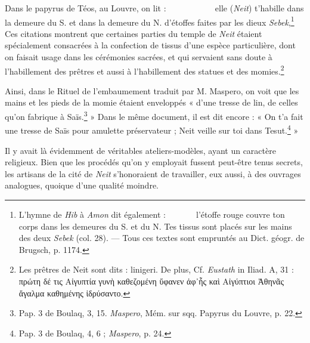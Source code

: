 \documentclass[a4paper, 11pt, oneside]{article}
\newcommand*\hieroglyhicsAAAC{}
\newcommand*\hieroglyhicsAAAG{}
\newcommand*\hieroglyhicsAAAQ{}
\newcommand*\hieroglyhicsAAAW{\raisebox{0.5ex}{}}
\newcommand*\hieroglyhicsAAAX{}
\newcommand*\hieroglyhicsAABR{}
\newcommand*\hieroglyhicsAACM{}
\newcommand*\hieroglyhicsAACN{\raisebox{1ex}{}}
\newcommand*\hieroglyhicsAACS{}
\newcommand*\hieroglyhicsAAEF{}
\newcommand*\hieroglyhicsAAEK{}
\newcommand*\hieroglyhicsAAEZ{}
\newcommand*\hieroglyhicsAAFD{}
\newcommand*\hieroglyhicsAAFZ{\raisebox{0.5ex}{}}
\newcommand*\hieroglyhicsAAGC{}
\newcommand*\hieroglyhicsAAGD{}
\newcommand*\hieroglyhicsAAGE{}
\newcommand*\hieroglyhicsAAGF{}
\newcommand*\hieroglyhicsAAGG{}
\newcommand*\hieroglyhicsAAGH{}
\newcommand*\hieroglyhicsAAGI{}
\newcommand*\hieroglyhicsAAGJ{}
\newcommand*\hieroglyhicsAAGK{}
\newcommand*\hieroglyhicsAAGL{}
\newcommand*\hieroglyhicsAAGM{}
\newcommand*\hieroglyhicsAAGN{}
\newcommand*\hieroglyhicsAAGO{}
\newcommand*\hieroglyhicsAAGP{\raisebox{0.3ex}{}}
\newcommand*\hieroglyhicsAAGQ{}
\newcommand*\hieroglyhicsAAGR{}
\newcommand*\hieroglyhicsAAGS{}
\newcommand*\hieroglyhicsAAGT{}
\begin{document}
Dans le papyrus de Téos, au Louvre, on lit : $\hieroglyhicsAACS\:\hieroglyhicsAAGC\:\hieroglyhicsAAAG\allowbreak\:\hieroglyhicsAABR\:\hieroglyhicsAAFZ\:\hieroglyhicsAACS\allowbreak\:\hieroglyhicsAAGD\:\hieroglyhicsAABR\:\hieroglyhicsAAAX\allowbreak\:\hieroglyhicsAAAQ\:\hieroglyhicsAAAC\:\hieroglyhicsAAGE\allowbreak\:\hieroglyhicsAAAW\:\hieroglyhicsAAGF\:\hieroglyhicsAAGG\allowbreak\:\hieroglyhicsAABR\:\hieroglyhicsAAGH\:\hieroglyhicsAACN\:\hieroglyhicsAACS\allowbreak\:\hieroglyhicsAAFD\:\hieroglyhicsAAGI\:\hieroglyhicsAAEK\allowbreak\:\hieroglyhicsAAEK\:\hieroglyhicsAAEF$ elle (\emph{Neit}) t'habille dans la demeure du S. et dans la demeure du N. d'étoffes faites par les dieux \emph{Sebek},\footnote{L'hymne de \emph{Hib} à \emph{Amon} dit également : $\hieroglyhicsAAGJ\:\hieroglyhicsAAGK\:\hieroglyhicsAACM\allowbreak\:\hieroglyhicsAAEZ\:\hieroglyhicsAAGL\:\hieroglyhicsAAGM\allowbreak\:\hieroglyhicsAAAX\:\hieroglyhicsAAGN\:\hieroglyhicsAAGO\:\hieroglyhicsAAGP\allowbreak\:\hieroglyhicsAAGQ\:\hieroglyhicsAAGR\allowbreak\:\hieroglyhicsAAGS\:\hieroglyhicsAAGT$ l'étoffe rouge couvre ton corps dans les demeures du S. et du N. Tes tissus sont placés sur les mains des deux \emph{Sebek} (col. 28). --- Tous ces textes sont empruntés au Dict. géogr. de Brugsch, p. 1174.} Ces citations montrent que certaines parties du temple de \emph{Neit} étaient spécialement consacrées à la confection de tissus d'une espèce particulière, dont on faisait usage dans les cérémonies sacrées, et qui servaient sans doute à l'habillement des prêtres et aussi à l'habillement des statues et des momies.\footnote{Les prêtres de Neit sont dits : linigeri. De plus, Cf. \emph{Eustath} in Iliad. A, 31 : πρώτη δέ τις Αἰγυπτία γυνὴ καθεζομένη ὕφανεν ἀφ᾽ἧς καὶ Αἰγύπτιοι Ἀθηνᾶς ἄγαλμα καθημένης ἱδρύσαντο.}

Ainsi, dans le Rituel de l'embaumement traduit par M. Maspero, on voit que les mains et les pieds de la momie étaient enveloppés « d'une tresse de lin, de celles qu'on fabrique à Saïs.\footnote{Pap. 3 de Boulaq, 3, 15. \emph{Maspero}, Mém. sur sqq. Papyrus du Louvre, p. 22.} » Dans le même document, il est dit encore : « On t'a fait une tresse de Saïs pour amulette préservateur ; Neit veille sur toi dans Tesut.\footnote{Pap. 3 de Boulaq, 4, 6 ; \emph{Maspero}, p. 24.} »

Il y avait là évidemment de véritables ateliers-modèles, ayant un caractère religieux. Bien que les procédés qu'on y employait fussent peut-être tenus secrets, les artisans de la cité de \emph{Neit} s'honoraient de travailler, eux aussi, à des ouvrages analogues, quoique d'une qualité moindre.
\end{document}
